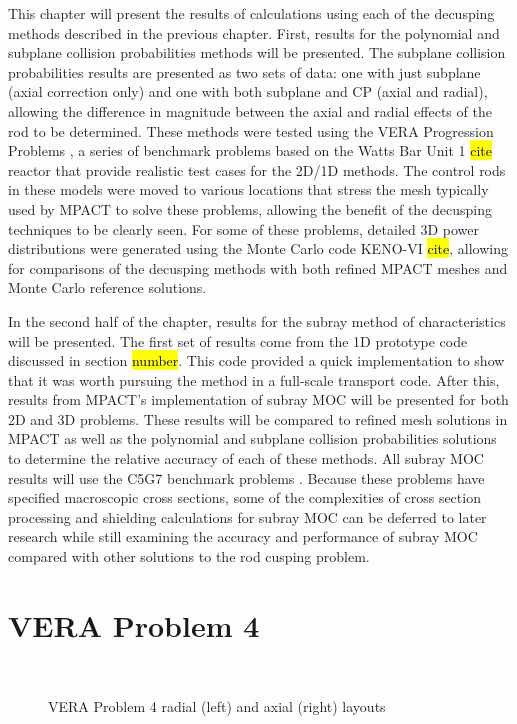 This chapter will present the results of calculations using each of the decusping methods described in the previous chapter.  First, results for the polynomial and subplane collision probabilities methods will be presented.  The subplane collision probabilities results are presented as two sets of data: one with just subplane (axial correction only) and one with both subplane and CP (axial and radial), allowing the difference in magnitude between the axial and radial effects of the rod to be determined.  These methods were tested using the VERA Progression Problems \cite{VERAProgressionProblems}, a series of benchmark problems based on the Watts Bar Unit 1 \hl{cite} reactor that provide realistic test cases for the 2D/1D methods.  The control rods in these models were moved to various locations that stress the mesh typically used by MPACT to solve these problems, allowing the benefit of the decusping techniques to be clearly seen.  For some of these problems, detailed 3D power distributions were generated using the Monte Carlo code KENO-VI \hl{cite}, allowing for comparisons of the decusping methods with both refined MPACT meshes and Monte Carlo reference solutions.

In the second half of the chapter, results for the subray method of characteristics will be presented.  The first set of results come from the 1D prototype code discussed in section \hl{number}.  This code provided a quick implementation to show that it was worth pursuing the method in a full-scale transport code.  After this, results from MPACT's implementation of subray MOC will be presented for both 2D and 3D problems.  These results will be compared to refined mesh solutions in MPACT as well as the polynomial and subplane collision probabilities solutions to determine the relative accuracy of each of these methods.  All subray MOC results will use the C5G7 benchmark problems \cite{EELewisC5G72003,EELewisC5G7extended2005}.  Because these problems have specified macroscopic cross sections, some of the complexities of cross section processing and shielding calculations for subray MOC can be deferred to later research while still examining the accuracy and performance of subray MOC compared with other solutions to the rod cusping problem.

\section{VERA Problem 4}

\begin{figure}[h]\label{f:p4layout}
    \centering
    ~
    \caption{VERA Problem 4 radial (left) and axial (right) layouts}\label{f:p4}
\end{figure}

